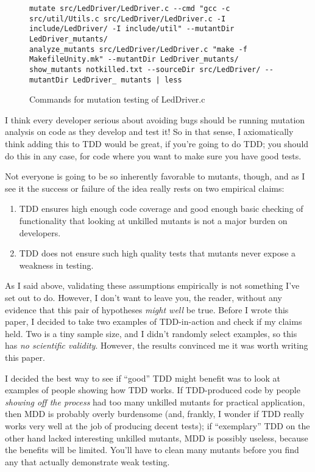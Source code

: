 \documentclass[sigplan,screen]{acmart}
\begin{document}
\begin{figure*}[t]
  {\scriptsize
\begin{verbatim}
mutate src/LedDriver/LedDriver.c --cmd "gcc -c src/util/Utils.c src/LedDriver/LedDriver.c -I include/LedDriver/ -I include/util" --mutantDir LedDriver_mutants/
analyze_mutants src/LedDriver/LedDriver.c "make -f MakefileUnity.mk" --mutantDir LedDriver_mutants/
show_mutants notkilled.txt --sourceDir src/LedDriver/ --mutantDir LedDriver_ mutants | less
\end{verbatim}
    }
  \caption{Commands for mutation testing of LedDriver.c}
  \label{fig:led}
\end{figure*}

I think every developer serious about avoiding bugs should be running
mutation analysis on code as they develop and test it!  So in that
sense, I axiomatically think adding this to TDD would be great, if
you're going to do TDD; you should do this in any case, for code where
you want to make sure you have good tests.

Not everyone is going to be so inherently favorable to mutants,
though, and as I see it the success or failure of the idea really
rests on two empirical claims:

\begin{enumerate}
  \item TDD ensures high enough code coverage and good enough basic
    checking of functionality that looking at unkilled mutants is not
    a major burden on developers.
    \item TDD does not ensure such high quality tests that mutants
      never expose a weakness in testing.
    \end{enumerate}

    As I said above, validating these assumptions empirically is not
    something I've set out to do.  However, I don't want to leave you,
    the reader, without any evidence that this pair of hypotheses
    \emph{might well} be true.  Before I wrote this paper, I decided
    to take two examples of TDD-in-action and check if my claims
    held.  Two is a tiny sample size, and I didn't randomly select
    examples, so this has \emph{no scientific validity}.  However, the
    results convinced me it was worth writing this paper.

    I decided the best way to see if ``good'' TDD might benefit was to
    look at examples of people showing how TDD works.  If TDD-produced
    code by people \emph{showing off the process} had too many
    unkilled mutants for practical application, then MDD is probably
    overly burdensome (and, frankly, I wonder if TDD really works very
    well at the job of producing decent tests); if ``exemplary'' TDD
    on the other hand lacked interesting unkilled mutants, MDD is
    possibly useless, because the benefits will be limited.  You'll
    have to clean many mutants before you find any that actually
    demonstrate weak testing.
\end{document}
